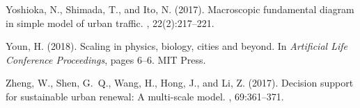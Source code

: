\documentclass[letterpaper]{article}
\begin{document}
\begin{thebibliography}{}
Yoshioka, N., Shimada, T., and Ito, N. (2017).
\newblock Macroscopic fundamental diagram in simple model of urban traffic.
, 22(2):217--221.

Youn, H. (2018).
\newblock Scaling in physics, biology, cities and beyond.
\newblock In {\em Artificial Life Conference Proceedings}, pages 6--6. MIT
  Press.

Zheng, W., Shen, G.~Q., Wang, H., Hong, J., and Li, Z. (2017).
\newblock Decision support for sustainable urban renewal: A multi-scale model.
, 69:361--371.

\end{thebibliography}
\end{document}
